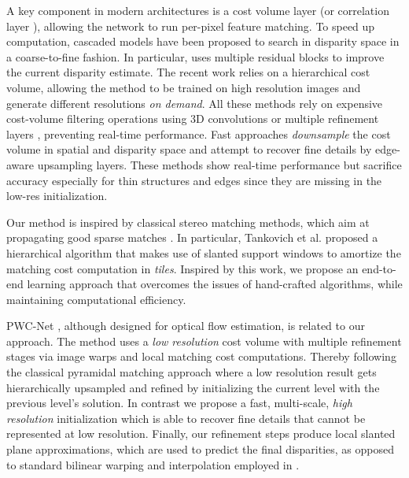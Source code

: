 \documentclass[final]{cvpr}
\begin{document}
A key component in modern architectures is a cost volume layer \cite{kendall2017end} (or correlation layer \cite{ilg2017flownet}), allowing the network to run per-pixel feature matching.
To speed up computation, cascaded models \cite{pang2017cascade,chang2018pyramid,liang2017learning,gidaris2017detect,yang2019hierarchical,Zhang2019GANet} have been proposed to search in disparity space in a coarse-to-fine fashion. In particular, \cite{pang2017cascade} uses multiple residual blocks to improve the current disparity estimate. The recent work \cite{yang2019hierarchical} relies on a hierarchical cost volume, allowing the method to be trained on high resolution images and generate different resolutions \textit{on demand}. All these methods rely on expensive cost-volume filtering operations using 3D convolutions \cite{yang2019hierarchical} or multiple refinement layers \cite{pang2017cascade}, preventing real-time performance. Fast approaches \cite{stereonet,activestereonet} \textit{downsample} the cost volume in spatial and disparity space and attempt to recover fine details by edge-aware upsampling layers. These methods show real-time performance but sacrifice accuracy especially for thin structures and edges since they are missing in the low-res initialization.
 
Our method is inspired by classical stereo matching methods, which aim at propagating good sparse matches \cite{fanello17_hashmatch,fanello2017ultrastereo,sos}. In particular, Tankovich et al. \cite{sos} proposed a hierarchical algorithm that makes use of slanted support windows to amortize the matching cost computation in \textit{tiles}. Inspired by this work, we propose an end-to-end learning approach that overcomes the issues of hand-crafted algorithms, while maintaining computational efficiency. 

PWC-Net \cite{pwcnet}, although designed for optical flow estimation, is related to our approach.  The method uses a \textit{low resolution} cost volume with multiple refinement stages via image warps and local matching cost computations. Thereby following the classical pyramidal matching approach where a low resolution result gets hierarchically upsampled and refined by initializing the current level with the previous level's solution. In contrast we propose a fast, multi-scale, \textit{high resolution} initialization which is able to recover fine details that cannot be represented at low resolution. Finally, our refinement steps produce local slanted plane approximations, which are used to predict the final disparities, as opposed to standard bilinear warping and interpolation employed in \cite{pwcnet}.
\end{document}
